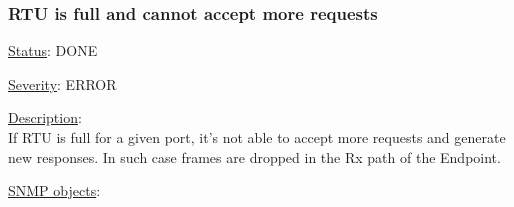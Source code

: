 \subsubsection{\bf RTU is full and cannot accept more requests}
		\label{fail:data:rtu_full}
		\begin{pck_descr}
			\item [] \underline{Status}: DONE
			\item [] \underline{Severity}: ERROR
			\item [] \underline{Description}:\\
				If RTU is full for a given port, it's not able to accept more requests
				and generate new responses. In such case frames are dropped in the
				Rx path of the Endpoint.
			\item [] \underline{SNMP objects}:\\
				{\footnotesize
				 \\
				\\
				\\
				 }
		\end{pck_descr}

